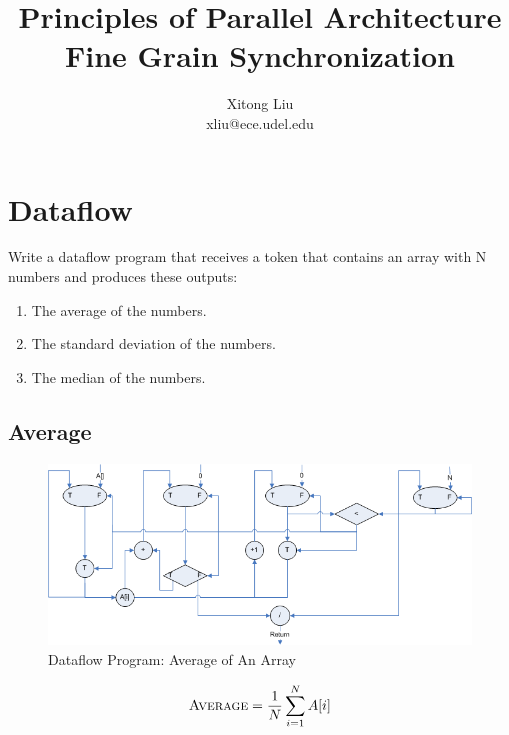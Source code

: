 \documentclass[12pt]{article}
\title{Principles of Parallel Architecture\\
Fine Grain Synchronization}
\author{Xitong Liu \\
xliu@ece.udel.edu}
\begin{document}
\maketitle

\section{Dataflow}
Write a dataflow program that receives a token that contains an 
array with N numbers and produces these outputs:
\begin{enumerate}
\item The average of the numbers.
\item The standard deviation of the numbers.
\item The median of the numbers.
\end{enumerate}
\subsection{Average}
\begin{figure}[h!]
	\begin{center}
		\includegraphics[width=1.1\textwidth, angle=0]{average.png}
		\caption{\label{fig:average}Dataflow Program: Average of An Array}
	\end{center}
\end{figure}
\begin{equation}
\textsc{Average} = \frac{1}{N}\sum_{i=1}^{N}A[i]
\end{equation}
\end{document}
